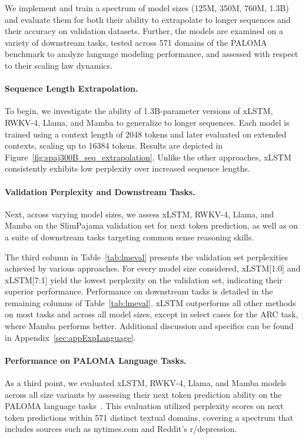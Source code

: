 We implement and train a spectrum of model sizes (125M, 350M, 760M, 1.3B) and evaluate them for both their ability to extrapolate to longer sequences and their accuracy on validation datasets. Further, the models are examined on a variety of downstream tasks, tested across 571 domains of the PALOMA benchmark to analyze language modeling performance, and assessed with respect to their scaling law dynamics.

\paragraph{Sequence Length Extrapolation.}
\label{sec:spaj300B_ctx_extrapolation}
To begin, we investigate the ability of 1.3B-parameter versions of xLSTM, RWKV-4, Llama, and Mamba to generalize to longer sequences. Each model is trained using a context length of 2048 tokens and later evaluated on extended contexts, scaling up to 16384 tokens. Results are depicted in Figure~\ref{fig:spaj300B_seq_extrapolation}. Unlike the other approaches, xLSTM consistently exhibits low perplexity over increased sequence lengths.

\paragraph{Validation Perplexity and Downstream Tasks.}
\label{sec:spaj_downstream_eval}
Next, across varying model sizes, we assess xLSTM, RWKV-4, Llama, and Mamba on the SlimPajama validation set for next token prediction, as well as on a suite of downstream tasks targeting common sense reasoning skills.

The third column in 
Table~\ref{tab:lmeval} presents the validation set perplexities achieved by various approaches. For every model size considered, xLSTM[1:0] and xLSTM[7:1] yield the lowest perplexity on the validation set, indicating their superior performance. Performance on downstream tasks is detailed in the remaining columns of 
Table~\ref{tab:lmeval}. xLSTM outperforms all other methods on most tasks and across all model sizes, except in select cases for the ARC task, where Mamba performs better. Additional discussion and specifics can be found in Appendix~\ref{sec:appExpLanguage}.

\paragraph{Performance on PALOMA Language Tasks.} As a third point, we evaluated xLSTM, RWKV-4, Llama, and Mamba models across all size variants by assessing their next token prediction ability on the PALOMA language tasks~\citep{Magnusson:23arxivshort}. This evaluation utilized perplexity scores on next token predictions within 571 distinct textual domains, covering a spectrum that includes sources such as nytimes.com and Reddit's r/depression.

